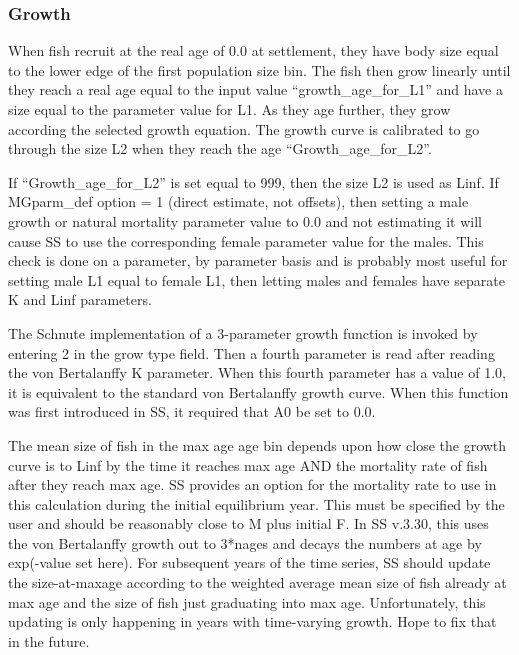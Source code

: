 \subsubsection{Growth}
When fish recruit at the real age of 0.0 at settlement, they have body size equal to the lower edge of the first population size bin.  The fish then grow linearly until they reach a real age equal to the input value “growth\_age\_for\_L1” and have a size equal to the parameter value for L1.  As they age further, they grow according the selected growth equation.  The growth curve is calibrated to go through the size L2 when they reach the age “Growth\_age\_for\_L2”.
	
If “Growth\_age\_for\_L2” is set equal to 999, then the size L2 is used as Linf.  If MGparm\_def option = 1 (direct estimate, not offsets), then setting a male growth or natural mortality parameter value to 0.0 and not estimating it will cause SS to use the corresponding female parameter value for the males. This check is done on a parameter, by parameter basis and is probably most useful for setting male L1 equal to female L1, then letting males and females have separate K and Linf parameters.
	
The Schnute implementation of a 3-parameter growth function is invoked by entering 2 in the grow type field.  Then a fourth parameter is read after reading the von Bertalanffy K parameter.  When this fourth parameter has a value of 1.0, it is equivalent to the standard von Bertalanffy growth curve.  When this function was first introduced in SS, it required that A0 be set to 0.0.
	
The mean size of fish in the max age age bin depends upon how close the growth curve is to Linf by the time it reaches max age AND the mortality rate of fish after they reach max age.  SS provides an option for the mortality rate to use in this calculation during the initial equilibrium year.  This must be specified by the user and should be reasonably close to M plus initial F.  In SS v.3.30, this uses the von Bertalanffy growth out to 3*nages and decays the numbers at age by exp(-value set here). For subsequent years of the time series, SS should update the size-at-maxage according to the weighted average mean size of fish already at max age and the size of fish just graduating into max age.  Unfortunately, this updating is only happening in years with time-varying growth.  Hope to fix that in the future.
	
